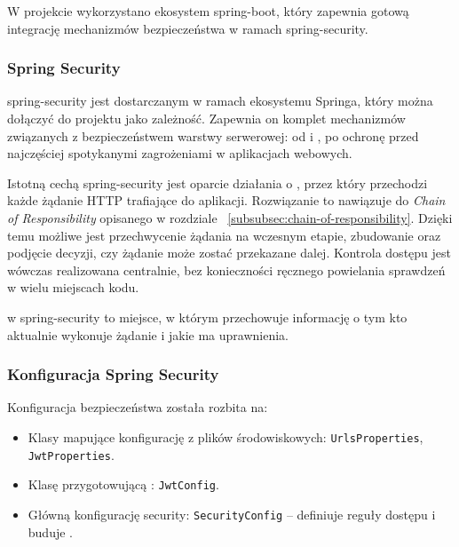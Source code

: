 W projekcie wykorzystano ekosystem \gls{spring-boot}, który zapewnia gotową integrację mechanizmów bezpieczeństwa
w ramach \gls{spring-security}.


\subsubsection{Spring Security}
\label{subsubsec:spring-security}

\gls{spring-security} jest  dostarczanym w ramach ekosystemu Springa,
który można dołączyć do projektu jako zależność.
Zapewnia on komplet mechanizmów związanych z bezpieczeństwem warstwy serwerowej:
od  i , po ochronę przed najczęściej spotykanymi zagrożeniami w aplikacjach webowych.

Istotną cechą \gls{spring-security} jest oparcie działania o ,
przez który przechodzi każde żądanie HTTP trafiające do aplikacji.
Rozwiązanie to nawiązuje do  \textit{Chain of Responsibility} opisanego w rozdziale ~\ref{subsubsec:chain-of-responsibility}.
Dzięki temu możliwe jest przechwycenie żądania na wczesnym etapie,
zbudowanie  oraz podjęcie decyzji, czy żądanie może zostać przekazane dalej.
Kontrola dostępu jest wówczas realizowana centralnie, bez konieczności ręcznego powielania sprawdzeń w wielu miejscach kodu.

 w \gls{spring-security} to miejsce,
w którym  przechowuje informację o tym kto aktualnie wykonuje żądanie i jakie ma uprawnienia.


\subsubsection{Konfiguracja Spring Security}
\label{subsubsec:konfiguracja-spring-security}

Konfiguracja bezpieczeństwa została rozbita na:
\begin{itemize}
    \item Klasy mapujące konfigurację z plików środowiskowych:
    \texttt{UrlsProperties}, \newline \texttt{JwtProperties}.
    \item Klasę przygotowującą  :
    \texttt{JwtConfig}.
    \item Główną konfigurację security:
    \texttt{SecurityConfig} -- definiuje reguły dostępu i buduje .
\end{itemize}

